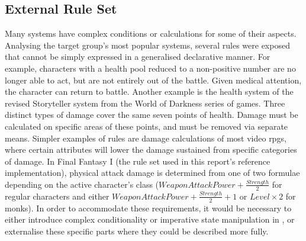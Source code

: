 \subsection{External Rule Set}
\label{language:ruleset}
Many systems have complex conditions or calculations for some of their aspects. Analysing the target group's most popular systems, several rules were exposed that cannot be simply expressed in a generalised declarative manner. For example, characters with a health pool reduced to a non-positive number are no longer able to act, but are not entirely out of the battle. Given medical attention, the character can return to battle. Another example is the health system of the revised Storyteller system from the World of Darkness series of games. Three distinct types of damage cover the same seven points of health. Damage must be calculated on specific areas of these points, and must be removed via separate means.
Simpler examples of rules are damage calculations of most video \ac{rpg}s, where certain attributes will lower the damage sustained from specific categories of damage. In Final Fantasy I (the rule set used in this report's reference implementation), physical attack damage is determined from one of two formulae depending on the active character's class ($WeaponAttackPower + \frac{Strength}{2}$ for regular characters and either $WeaponAttackPower + \frac{Strength}{2} + 1$ or $Level \times 2$ for monks).
In order to accommodate these requirements, it would be necessary to either introduce complex conditionality or imperative state manipulation in \langname{}, or externalise these specific parts where they could be described more fully.

